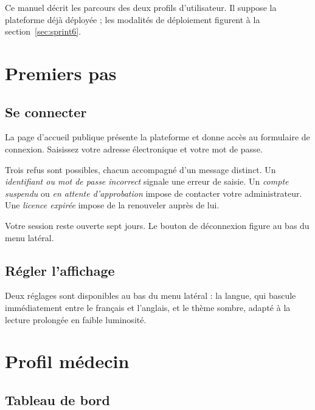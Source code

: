 Ce manuel décrit les parcours des deux profils d'utilisateur. Il suppose la plateforme
déjà déployée ; les modalités de déploiement figurent à la
section~\ref{sec:sprint6}.

\section{Premiers pas}

\subsection*{Se connecter}

La page d'accueil publique présente la plateforme et donne accès au formulaire de
connexion. Saisissez votre adresse électronique et votre mot de passe.

Trois refus sont possibles, chacun accompagné d'un message distinct. Un
\emph{identifiant ou mot de passe incorrect} signale une erreur de saisie. Un
\emph{compte suspendu} ou \emph{en attente d'approbation} impose de contacter votre
administrateur. Une \emph{licence expirée} impose de la renouveler auprès de lui.

Votre session reste ouverte sept jours. Le bouton de déconnexion figure au bas du menu
latéral.

\subsection*{Régler l'affichage}

Deux réglages sont disponibles au bas du menu latéral : la langue, qui bascule
immédiatement entre le français et l'anglais, et le thème sombre, adapté à la
lecture prolongée en faible luminosité.

\section{Profil médecin}

\subsection*{Tableau de bord}

